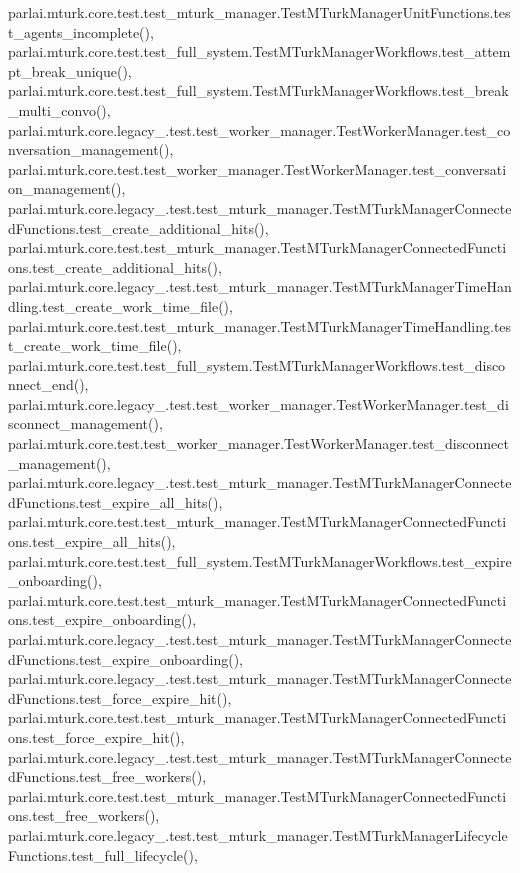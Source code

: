 parlai.\+mturk.\+core.\+test.\+test\+\_\+mturk\+\_\+manager.\+Test\+M\+Turk\+Manager\+Unit\+Functions.\+test\+\_\+agents\+\_\+incomplete(), parlai.\+mturk.\+core.\+test.\+test\+\_\+full\+\_\+system.\+Test\+M\+Turk\+Manager\+Workflows.\+test\+\_\+attempt\+\_\+break\+\_\+unique(), parlai.\+mturk.\+core.\+test.\+test\+\_\+full\+\_\+system.\+Test\+M\+Turk\+Manager\+Workflows.\+test\+\_\+break\+\_\+multi\+\_\+convo(), parlai.\+mturk.\+core.\+legacy\+\_.\+test.\+test\+\_\+worker\+\_\+manager.\+Test\+Worker\+Manager.\+test\+\_\+conversation\+\_\+management(), parlai.\+mturk.\+core.\+test.\+test\+\_\+worker\+\_\+manager.\+Test\+Worker\+Manager.\+test\+\_\+conversation\+\_\+management(), parlai.\+mturk.\+core.\+legacy\+\_.\+test.\+test\+\_\+mturk\+\_\+manager.\+Test\+M\+Turk\+Manager\+Connected\+Functions.\+test\+\_\+create\+\_\+additional\+\_\+hits(), parlai.\+mturk.\+core.\+test.\+test\+\_\+mturk\+\_\+manager.\+Test\+M\+Turk\+Manager\+Connected\+Functions.\+test\+\_\+create\+\_\+additional\+\_\+hits(), parlai.\+mturk.\+core.\+legacy\+\_.\+test.\+test\+\_\+mturk\+\_\+manager.\+Test\+M\+Turk\+Manager\+Time\+Handling.\+test\+\_\+create\+\_\+work\+\_\+time\+\_\+file(), parlai.\+mturk.\+core.\+test.\+test\+\_\+mturk\+\_\+manager.\+Test\+M\+Turk\+Manager\+Time\+Handling.\+test\+\_\+create\+\_\+work\+\_\+time\+\_\+file(), parlai.\+mturk.\+core.\+test.\+test\+\_\+full\+\_\+system.\+Test\+M\+Turk\+Manager\+Workflows.\+test\+\_\+disconnect\+\_\+end(), parlai.\+mturk.\+core.\+legacy\+\_.\+test.\+test\+\_\+worker\+\_\+manager.\+Test\+Worker\+Manager.\+test\+\_\+disconnect\+\_\+management(), parlai.\+mturk.\+core.\+test.\+test\+\_\+worker\+\_\+manager.\+Test\+Worker\+Manager.\+test\+\_\+disconnect\+\_\+management(), parlai.\+mturk.\+core.\+legacy\+\_.\+test.\+test\+\_\+mturk\+\_\+manager.\+Test\+M\+Turk\+Manager\+Connected\+Functions.\+test\+\_\+expire\+\_\+all\+\_\+hits(), parlai.\+mturk.\+core.\+test.\+test\+\_\+mturk\+\_\+manager.\+Test\+M\+Turk\+Manager\+Connected\+Functions.\+test\+\_\+expire\+\_\+all\+\_\+hits(), parlai.\+mturk.\+core.\+test.\+test\+\_\+full\+\_\+system.\+Test\+M\+Turk\+Manager\+Workflows.\+test\+\_\+expire\+\_\+onboarding(), parlai.\+mturk.\+core.\+test.\+test\+\_\+mturk\+\_\+manager.\+Test\+M\+Turk\+Manager\+Connected\+Functions.\+test\+\_\+expire\+\_\+onboarding(), parlai.\+mturk.\+core.\+legacy\+\_.\+test.\+test\+\_\+mturk\+\_\+manager.\+Test\+M\+Turk\+Manager\+Connected\+Functions.\+test\+\_\+expire\+\_\+onboarding(), parlai.\+mturk.\+core.\+legacy\+\_.\+test.\+test\+\_\+mturk\+\_\+manager.\+Test\+M\+Turk\+Manager\+Connected\+Functions.\+test\+\_\+force\+\_\+expire\+\_\+hit(), parlai.\+mturk.\+core.\+test.\+test\+\_\+mturk\+\_\+manager.\+Test\+M\+Turk\+Manager\+Connected\+Functions.\+test\+\_\+force\+\_\+expire\+\_\+hit(), parlai.\+mturk.\+core.\+legacy\+\_.\+test.\+test\+\_\+mturk\+\_\+manager.\+Test\+M\+Turk\+Manager\+Connected\+Functions.\+test\+\_\+free\+\_\+workers(), parlai.\+mturk.\+core.\+test.\+test\+\_\+mturk\+\_\+manager.\+Test\+M\+Turk\+Manager\+Connected\+Functions.\+test\+\_\+free\+\_\+workers(), parlai.\+mturk.\+core.\+legacy\+\_.\+test.\+test\+\_\+mturk\+\_\+manager.\+Test\+M\+Turk\+Manager\+Lifecycle\+Functions.\+test\+\_\+full\+\_\+lifecycle(), 